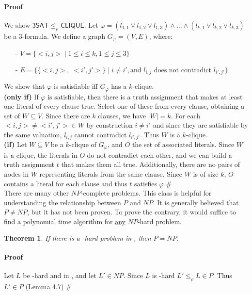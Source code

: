 \documentclass{report}
\newcommand{\NP}{\text{$\mathit{NP}$}}
\newcommand{\Po}{\text{$\mathit{P}$}}
\newtheorem{theorem}[definition]{Theorem}
\begin{document}
\paragraph{Proof} We show $\mathsf{3SAT} \leq_\rho \mathsf{CLIQUE}$. Let $\varphi = (l_{1,1} \lor l_{1,2} \lor l_{1,3}) \land \dots \land (l_{k,1} \lor l_{k,2} \lor l_{k,3})$ be a 3-formula. We define a graph $G_\varphi = (V,E)$, where:
\begin{itemize}
\item[-] $V = \{ <i,j>\;|\;1\leq i \leq k, 1\leq j \leq 3\}$
\item[-] $E = \{\{<i,j>,\;<i',j'>\}\;|\;i\neq i', \text{and }l_{i,j} \text{ does not contradict }l_{i',j'}\}$
\end{itemize}
We show that $\varphi$ is satisfiable iff $G_\varphi$ has a $k$-clique.\\
\textbf{(only if)} If $\varphi$ is satisfiable, then there is a truth assignment that makes at least one literal of every clause true. Select one of these from every clause, obtaining a set of $W\subseteq V$. Since there are $k$ clauses, we have $|W| = k$. For each $<i,j>\neq<i',j'> \in W$ by construction $i\neq i'$ and since they are satisfiable by the same valuation, $l_{i,j}$ cannot contradict $l_{i',j'}$. Thus $W$ is a $k$-clique.\\
\textbf{(if)} Let $W \subseteq V$ be a $k$-clique of $G_\varphi$, and $O$ the set of associated literals. Since $W$ is a clique, the literals in $O$ do not contradict each other, and we can build a truth assignment $t$ that makes them all true. Additionally, there are no pairs of nodes in $W$ representing literals from the same clause. Since $W$ is of size $k$, $O$ contains a  literal for each clause and thus $t$ satisfies $\varphi$ \#\\

There are many other $NP$-complete problems. This class is helpful for understanding the relationship between $P$ and $NP$. It is generally believed that $P \neq NP$, but it has not been proven. To prove the contrary, it would suffice to find a polynomial time algorithm for \underline{any} $NP$-hard problem.

\begin{theorem}If there is a \NP-hard problem in \Po, then $\Po=\NP$.
\end{theorem}

\paragraph{Proof}Let $L$ be \NP-hard and in \Po, and let $L' \in \NP$. Since $L$ is \NP-hard $L' \leq_\rho L \in \Po$. Thus $L' \in \Po$ (Lemma 4.7) \#\\
\end{document}

